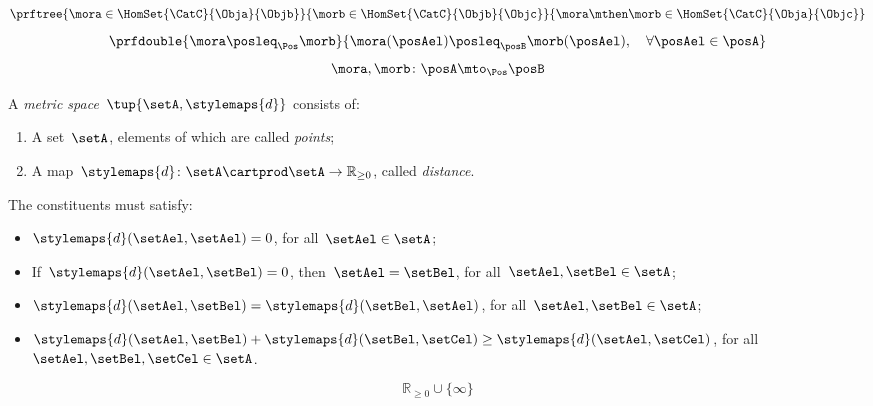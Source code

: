 {\begin{forslides}
\begin{equation*}
            \label{eq:poset_bool_m}
            \prftree{\mora \in \HomSet{\CatC}{\Obja}{\Objb}}{\morb \in \HomSet{\CatC}{\Objb}{\Objc}}{{\mora\mthen \morb \in \HomSet{\CatC}{\Obja}{\Objc}}}
        \end{equation*}
        \begin{equation*}
            \label{eq:poset_pos_a}
            \prfdouble{
                \mora \posleq_\Pos \morb}{\mora(\posAel)\posleq_\posB \morb(\posAel), \quad \forall \posAel \in \posA}
        \end{equation*}
        \begin{equation*}
            \label{eq:poset_pos_b}
            \mora,\morb\colon \posA\mto_\Pos \posB
        \end{equation*}
        \begin{definition}
            \label{def:metric_space}
            A \emph{metric space}~$\tup{\setA,\stylemaps{d}}$ consists of:
            \begin{enumerate}
                \item A set~$\setA$, elements of which are called \emph{points};
                \item A map~$\stylemaps{d}\colon \setA\cartprod \setA \to \mathbb{R}_{\geq 0}$, called \emph{distance}.
            \end{enumerate}
            The constituents must satisfy:
            \begin{itemize}
                \item $\stylemaps{d}(\setAel,\setAel)=0$, for all~$\setAel\in \setA$;
                \item If~$\stylemaps{d}(\setAel, \setBel)=0$, then~$\setAel=\setBel$, for all~$\setAel,\setBel\in \setA$;
                \item $\stylemaps{d}(\setAel, \setBel)=\stylemaps{d}(\setBel, \setAel)$, for all~$\setAel,\setBel\in \setA$;
                \item $\stylemaps{d}(\setAel, \setBel)+\stylemaps{d}(\setBel, \setCel)\geq \stylemaps{d}(\setAel, \setCel)$, for all~$\setAel,\setBel,\setCel\in \setA$.
            \end{itemize}
        \end{definition}
        \begin{equation*}
            \label{eq:r_with_inft}
            \mathbb{R}_{\geq 0}\cup \{\infty\}
        \end{equation*}
        \begin{equation*}
            \label{eq:cost_cat}

\end{equation*}
\end{forslides}}
